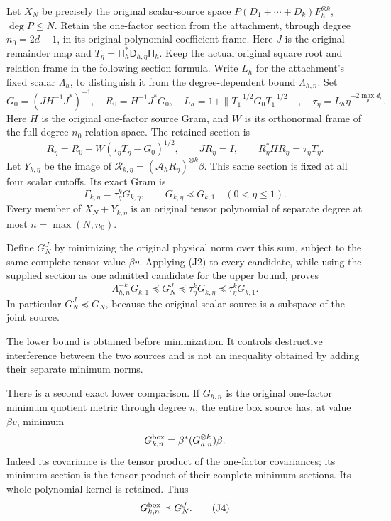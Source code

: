 \documentclass[11pt]{article}
\begin{document}
Let \(X_N\) be precisely the original scalar-source space \(P(D_1+\cdots+D_k)F_h^{\otimes k}\), \(\deg P\le N\). Retain the one-factor section from the attachment, through degree \(n_0=2d-1\), in its original polynomial coefficient frame. Here \(J\) is the original remainder map and \(T_\eta=\mathsf H_h^*\mathsf D_{h,\eta}\mathsf H_h\). Keep the actual original square root and relation frame in the following section formula. Write \(L_h\) for the attachment's fixed scalar \(\Lambda_h\), to distinguish it from the degree-dependent bound \(\Lambda_{h,n}\). Set \[
 G_0=(JH^{-1}J^*)^{-1},\quad
 R_0=H^{-1}J^*G_0,\quad
 L_h=1+\|T_1^{-1/2}G_0T_1^{-1/2}\|,\quad
 \tau_\eta=L_h\eta^{-2\max_\rho d_\rho}.
\] Here \(H\) is the original one-factor source Gram, and \(W\) is its orthonormal frame of the full degree-\(n_0\) relation space. The retained section is \[
 R_\eta=R_0+W(\tau_\eta T_\eta-G_0)^{1/2},\qquad
 JR_\eta=I,\qquad R_\eta^*HR_\eta=\tau_\eta T_\eta.
\] Let \(Y_{k,\eta}\) be the image of \(\mathcal R_{k,\eta}=(\mathcal A_hR_\eta)^{\otimes k}\beta\). This same section is fixed at all four scalar cutoffs. Its exact Gram is \[
 \Gamma_{k,\eta}=\tau_\eta^kG_{k,\eta},\qquad
 G_{k,\eta}\preceq G_{k,1}\quad(0<\eta\le1).
\] Every member of \(X_N+Y_{k,\eta}\) is an original tensor polynomial of separate degree at most \(n=\max(N,n_0)\).

Define \(G_N^J\) by minimizing the original physical norm over this sum, subject to the same complete tensor value \(\beta v\). Applying (J2) to every candidate, while using the supplied section as one admitted candidate for the upper bound, proves \[
 \boxed{
 \Lambda_{h,n}^{-k}G_{k,1}
 \preceq G_N^J
 \preceq\tau_\eta^kG_{k,\eta}
 \preceq\tau_\eta^kG_{k,1}.
 } \tag{J3}
\] In particular \(G_N^J\preceq G_N\), because the original scalar source is a subspace of the joint source.

The lower bound is obtained before minimization. It controls destructive interference between the two sources and is not an inequality obtained by adding their separate minimum norms.

There is a second exact lower comparison. If \(G_{h,n}\) is the original one-factor minimum quotient metric through degree \(n\), the entire box source has, at value \(\beta v\), minimum \[
 G_{k,n}^{\rm box}=\beta^*(G_{h,n}^{\otimes k})\beta.
\] Indeed its covariance is the tensor product of the one-factor covariances; its minimum section is the tensor product of their complete minimum sections. Its whole polynomial kernel is retained. Thus \[
 G_{k,n}^{\rm box}\preceq G_N^J. \tag{J4}
\]
\end{document}
